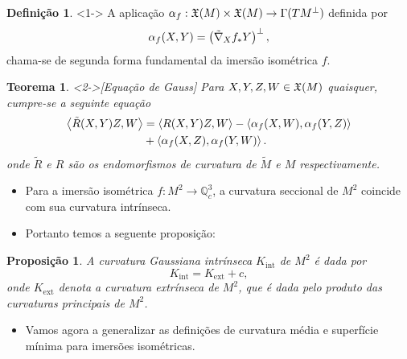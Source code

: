 \documentclass[12pt,a4paper]{beamer}
\newtheorem{teorema}{Teorema}
\newtheorem{proposicao}{Proposição}
\theoremstyle{definition}
\newtheorem{definicao}{Definição}
\begin{document}
\begin{frame}
	
	\begin{definicao}<1->
		A aplicação $\alpha_f: \mathfrak{X}(M) \times \mathfrak{X}(M) \rightarrow \Gamma(TM^\perp)$ definida por
		\begin{equation*}
		\alpha_f(X,Y) = \left( \tilde{\nabla}_X f_* Y \right)^\perp,
		\end{equation*}
		chama-se de \alert{segunda forma fundamental} da imersão isométrica $f$.
	\end{definicao}
	
	\begin{teorema}<2->[Equação de Gauss]
		Para $X,Y,Z,W \in \mathfrak{X}(M)$ quaisquer, cumpre-se a seguinte equação
		\begin{align*}
			\left\langle \tilde{R}(X,Y)Z,W \right\rangle &= \left\langle R(X,Y)Z,W \right\rangle - \left\langle \alpha_f(X,W),\alpha_f(Y,Z) \right\rangle\\
			&+ \left\langle \alpha_f(X,Z),\alpha_f(Y,W) \right\rangle.
		\end{align*}
		onde $\tilde{R}$ e $R$ são os endomorfismos de curvatura de $\tilde{M}$ e $M$ respectivamente.
	\end{teorema}

\end{frame}

\begin{frame}

	\begin{itemize}
		\item Para a imersão isométrica $f: M^2 \rightarrow \mathbb{Q}^3_c$, a curvatura seccional de $M^2$ coincide com sua curvatura intrínseca.
		\pause
		\item Portanto temos a seguente proposição:
		\pause
	\end{itemize}
	

	\begin{proposicao}
		A curvatura Gaussiana intrínseca $K_{\text{int}}$ de $M^2$ é dada por
		\begin{equation*}
			K_{\text{int}} = K_{\text{ext}} + c,
		\end{equation*}
		onde $K_{\text{ext}}$ denota a curvatura extrínseca de $M^2$, que é dada pelo produto das curvaturas principais de $M^2$.
	\end{proposicao}

	\pause

	\begin{itemize}
		\item Vamos agora a generalizar as definições de curvatura média e superfície mínima para imersões isométricas.
	\end{itemize}
	
\end{frame}
\end{document}
